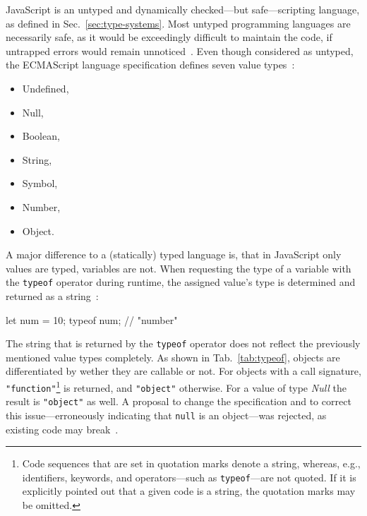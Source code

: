 JavaScript is an untyped and dynamically checked---but safe---scripting language, as defined in Sec.~\ref{sec:type-systems}. Most untyped programming languages are necessarily safe, as it would be exceedingly difficult to maintain the code, if untrapped errors would remain unnoticed~\cite[p.~97-4]{TypeSystems:Cardelli:2004}. Even though considered as untyped, the ECMAScript language specification defines seven value types~\cite[p.~16]{ES6Spec:Ecma:2015}:
\begin{itemize}
  \item Undefined,
  \item Null,
  \item Boolean,
  \item String,
  \item Symbol,
  \item Number,
  \item Object.
\end{itemize}
A major difference to a (statically) typed language is, that in JavaScript only values are typed, variables are not. When requesting the type of a variable with the \texttt{typeof} operator during runtime, the assigned value's type is determined and returned as a string~\cite[p.~30]{YDKJS:UpAndGoing:Simpson:2015}:
\begin{JsCode}[numbers=none]
let num = 10;
typeof num; // "number"
\end{JsCode}

\noindent
The string that is returned by the \texttt{typeof} operator does not reflect the previously mentioned value types completely. As shown in Tab.~\ref{tab:typeof}, objects are differentiated by wether they are callable or not. For objects with a call signature, \texttt{"function"}\footnote{Code sequences that are set in quotation marks denote a string, whereas, e.g., identifiers, keywords, and operators---such as \texttt{typeof}---are not quoted. If it is explicitly pointed out that a given code is a string, the quotation marks may be omitted.} is returned, and \texttt{"object"} otherwise. For a value of type \emph{Null} the result is \texttt{"object"} as well. A proposal to change the specification and to correct this issue---erroneously indicating that \texttt{null} is an object---was rejected, as existing code may break~\cite{TypeofNull:Smith:2013, typeof:MDN:2017}.

